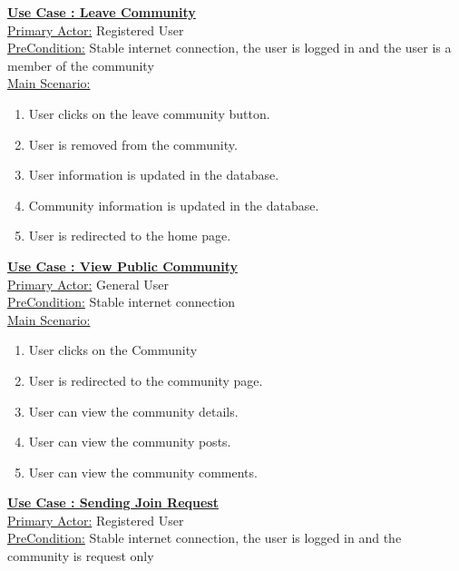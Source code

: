 \documentclass[conference,compsoc]{IEEEtran}
\newcounter{UC}
\newcommand{\nextU}{\stepcounter{UC}\theUC}
\begin{document}
\underline{\textbf{Use Case \nextU: Leave Community}}\\

\underline{Primary Actor:} Registered User\\

\underline{PreCondition:} Stable internet connection, the user is logged in and the user is a member of the community\\

\underline{Main Scenario:}\\
\begin{enumerate}
    \item User clicks on the leave community button.
    \item User is removed from the community.
    \item User information is updated in the database.
    \item Community information is updated in the database.
    \item User is redirected to the home page.
\end{enumerate}

\underline{\textbf{Use Case \nextU: View Public Community}}\\

\underline{Primary Actor:} General User\\

\underline{PreCondition:} Stable internet connection\\

\underline{Main Scenario:}\\
\begin{enumerate}
    \item User clicks on the Community
    \item User is redirected to the community page.
    \item User can view the community details.
    \item User can view the community posts.
    \item User can view the community comments.
\end{enumerate}

\underline{\textbf{Use Case \nextU: Sending Join Request}}\\

\underline{Primary Actor:} Registered User\\

\underline{PreCondition:} Stable internet connection, the user is logged in and the community is request only\\
\end{document}

